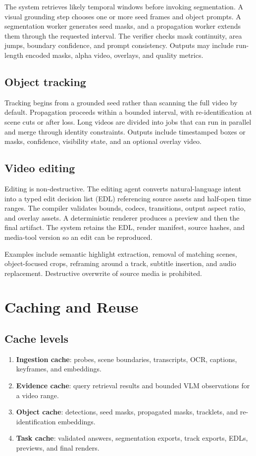 \documentclass[11pt]{article}
\newcommand{\term}[1]{\textbf{#1}}
\begin{document}
The system retrieves likely temporal windows before invoking segmentation. A
visual grounding step chooses one or more seed frames and object prompts. A
segmentation worker generates seed masks, and a propagation worker extends them
through the requested interval. The verifier checks mask continuity, area jumps,
boundary confidence, and prompt consistency. Outputs may include run-length
encoded masks, alpha video, overlays, and quality metrics.

\subsection{Object tracking}

Tracking begins from a grounded seed rather than scanning the full video by
default. Propagation proceeds within a bounded interval, with re-identification
at scene cuts or after loss. Long videos are divided into jobs that can run in
parallel and merge through identity constraints. Outputs include timestamped
boxes or masks, confidence, visibility state, and an optional overlay video.

\subsection{Video editing}

Editing is non-destructive. The editing agent converts natural-language intent
into a typed edit decision list (EDL) referencing source assets and half-open
time ranges. The compiler validates bounds, codecs, transitions, output aspect
ratio, and overlay assets. A deterministic renderer produces a preview and then
the final artifact. The system retains the EDL, render manifest, source hashes,
and media-tool version so an edit can be reproduced.

Examples include semantic highlight extraction, removal of matching scenes,
object-focused crops, reframing around a track, subtitle insertion, and audio
replacement. Destructive overwrite of source media is prohibited.

\section{Caching and Reuse}

\subsection{Cache levels}

\begin{enumerate}
  \item \term{Ingestion cache}: probes, scene boundaries, transcripts, OCR,
  captions, keyframes, and embeddings.
  \item \term{Evidence cache}: query retrieval results and bounded VLM
  observations for a video range.
  \item \term{Object cache}: detections, seed masks, propagated masks, tracklets,
  and re-identification embeddings.
  \item \term{Task cache}: validated answers, segmentation exports, track exports,
  EDLs, previews, and final renders.
\end{enumerate}
\end{document}
